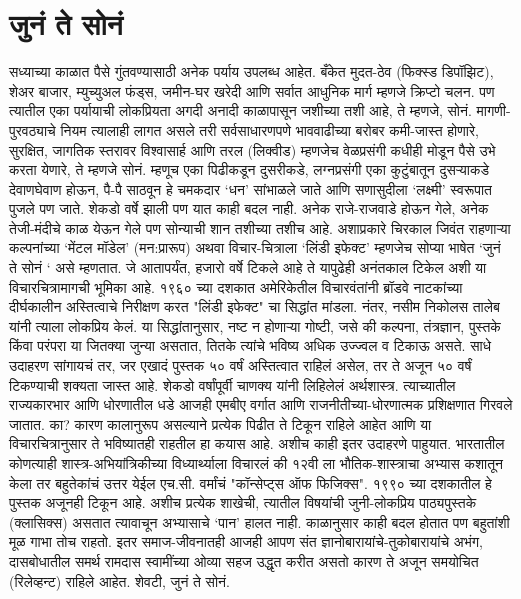 \chapter{जुनं ते सोनं}

सध्याच्या काळात पैसे गुंतवण्यासाठी अनेक पर्याय उपलब्ध आहेत. बँकेत मुदत-ठेव (फिक्स्ड डिपॉझिट), शेअर बाजार, म्युच्युअल फंड्स, जमीन-घर खरेदी आणि सर्वात आधुनिक मार्ग म्हणजे क्रिप्टो चलन. पण त्यातील एका पर्यायाची लोकप्रियता अगदी अनादी काळापासून जशीच्या तशी आहे, ते म्हणजे, सोनं. मागणी-पुरवठ्याचे नियम त्यालाही लागत असले तरी सर्वसाधारणपणे भाववाढीच्या बरोबर कमी-जास्त होणारे, सुरक्षित, जागतिक स्तरावर विश्वासार्ह आणि तरल (लिक्वीड) म्हणजेच वेळप्रसंगी कधीही मोडून पैसे उभे करता येणारे, ते म्हणजे सोनं. म्हणूच एका पिढीकडून दुसरीकडे, लग्नप्रसंगी एका कुटुंबातून दुसऱ्याकडे देवाणघेवाण होऊन, पै-पै साठवून हे चमकदार ‘धन’ सांभाळले जाते आणि सणासुदीला ‘लक्ष्मी’ स्वरूपात पुजले पण जाते. शेकडो वर्षे झाली पण यात काही बदल नाही. अनेक राजे-राजवाडे होऊन गेले, अनेक तेजी-मंदीचे काळ येऊन गेले पण सोन्याची शान तशीच्या तशीच आहे. अशाप्रकारे चिरकाल जिवंत राहणाऱ्या कल्पनांच्या ‘मेंटल मॉडेल’ (मन:प्रारूप) अथवा विचार-चित्राला ‘लिंडी इफेक्ट’ म्हणजेच सोप्या भाषेत ‘जुनं ते सोनं ‘ असे म्हणतात. जे आतापर्यंत, हजारो वर्षे टिकले आहे ते यापुढेही अनंतकाल टिकेल अशी या विचारचित्रामागची भूमिका आहे. 
१९६० च्या दशकात अमेरिकेतील विचारवंतांनी ब्रॉडवे नाटकांच्या दीर्घकालीन अस्तित्वाचे निरीक्षण करत "लिंडी इफेक्ट" चा सिद्धांत मांडला. नंतर, नसीम निकोलस तालेब यांनी त्याला लोकप्रिय केलं. या सिद्धांतानुसार, नष्ट न होणाऱ्या गोष्टी, जसे की कल्पना, तंत्रज्ञान, पुस्तके किंवा परंपरा या जितक्या जुन्या असतात, तितके त्यांचे भविष्य अधिक उज्ज्वल व टिकाऊ असते. साधे उदाहरण सांगायचं तर, जर एखादं पुस्तक ५० वर्षं अस्तित्वात राहिलं असेल, तर ते अजून ५० वर्षं टिकण्याची शक्यता जास्त आहे. शेकडो वर्षांपूर्वी चाणक्य यांनी लिहिलेलं अर्थशास्त्र. त्याच्यातील राज्यकारभार आणि धोरणातील धडे आजही एमबीए वर्गात आणि राजनीतीच्या-धोरणात्मक प्रशिक्षणात गिरवले जातात. का? कारण कालानुरूप असल्याने प्रत्येक पिढीत ते टिकून राहिले आहेत आणि या विचारचित्रानुसार ते भविष्यातही राहतील हा कयास आहे. अशीच काही इतर उदाहरणे पाहुयात. 
भारतातील कोणत्याही शास्त्र-अभियांत्रिकीच्या विध्यार्थ्याला विचारलं की १२वी ला भौतिक-शास्त्राचा अभ्यास कशातून केला तर बहुतेकांचं उत्तर येईल एच.सी. वर्मांचं "कॉन्सेप्ट्स ऑफ फिजिक्स". १९९० च्या दशकातील हे पुस्तक अजूनही टिकून आहे. अशीच प्रत्येक शाखेची, त्यातील विषयांची जुनी-लोकप्रिय पाठ्यपुस्तके (क्लासिक्स) असतात त्यावाचून अभ्यासाचे ‘पान’ हालत नाही. काळानुसार काही बदल होतात पण बहुतांशी मूळ गाभा तोच राहतो. इतर समाज-जीवनातही आजही आपण संत ज्ञानोबारायांचे-तुकोबारायांचे अभंग, दासबोधातील समर्थ रामदास स्वामींच्या ओव्या सहज उद्धृत करीत असतो कारण ते अजून समयोचित (रिलेव्हन्ट) राहिले आहेत. शेवटी, जुनं ते सोनं. 
